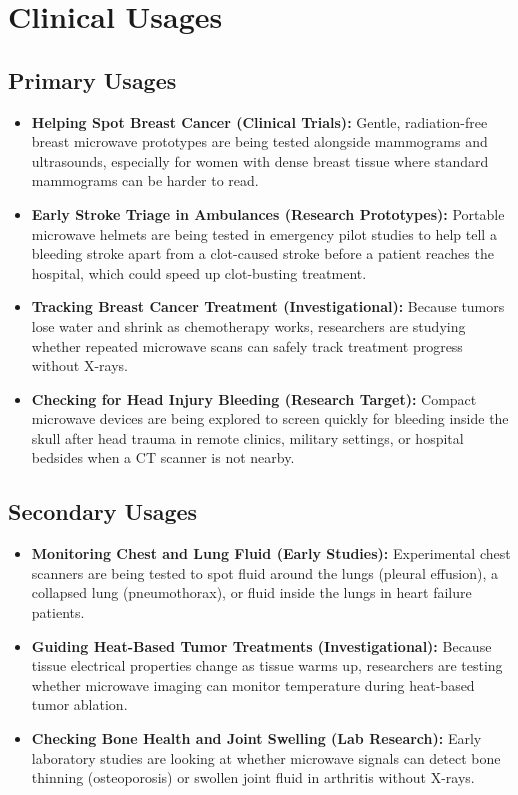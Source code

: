 \section{Clinical Usages}

\subsection{Primary Usages}
\begin{itemize}
  \item \textbf{Helping Spot Breast Cancer (Clinical Trials):} Gentle, radiation-free breast microwave prototypes are being tested alongside mammograms and ultrasounds, especially for women with dense breast tissue where standard mammograms can be harder to read.
  \item \textbf{Early Stroke Triage in Ambulances (Research Prototypes):} Portable microwave helmets are being tested in emergency pilot studies to help tell a bleeding stroke apart from a clot-caused stroke before a patient reaches the hospital, which could speed up clot-busting treatment.
  \item \textbf{Tracking Breast Cancer Treatment (Investigational):} Because tumors lose water and shrink as chemotherapy works, researchers are studying whether repeated microwave scans can safely track treatment progress without X-rays.
  \item \textbf{Checking for Head Injury Bleeding (Research Target):} Compact microwave devices are being explored to screen quickly for bleeding inside the skull after head trauma in remote clinics, military settings, or hospital bedsides when a CT scanner is not nearby.
\end{itemize}

\subsection{Secondary Usages}
\begin{itemize}
  \item \textbf{Monitoring Chest and Lung Fluid (Early Studies):} Experimental chest scanners are being tested to spot fluid around the lungs (pleural effusion), a collapsed lung (pneumothorax), or fluid inside the lungs in heart failure patients.
  \item \textbf{Guiding Heat-Based Tumor Treatments (Investigational):} Because tissue electrical properties change as tissue warms up, researchers are testing whether microwave imaging can monitor temperature during heat-based tumor ablation.
  \item \textbf{Checking Bone Health and Joint Swelling (Lab Research):} Early laboratory studies are looking at whether microwave signals can detect bone thinning (osteoporosis) or swollen joint fluid in arthritis without X-rays.
\end{itemize}

